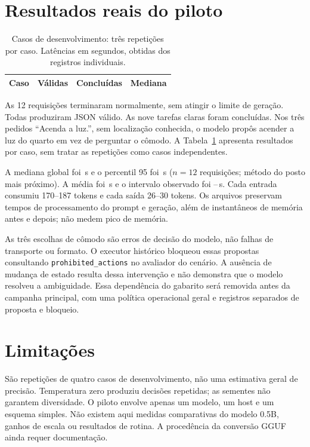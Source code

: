 \documentclass[letterpaper,conference]{IEEEtran}
\begin{document}
\section{Resultados reais do piloto}
\begin{table}[t]
\caption{Casos de desenvolvimento: três repetições por caso. Latências em segundos, obtidas dos registros individuais.}
\centering\footnotesize
\begin{tabular}{lrrr}\toprule
Caso & Válidas & Concluídas & Mediana\\\midrule

\end{tabular}
\label{tab:pilot}
\end{table}
As 12 requisições terminaram normalmente, sem atingir o limite de geração. Todas produziram JSON válido. As nove tarefas claras foram concluídas. Nos três pedidos ``Acenda a luz.'', sem localização conhecida, o modelo propôs acender a luz do quarto em vez de perguntar o cômodo. A Tabela~\ref{tab:pilot} apresenta resultados por caso, sem tratar as repetições como casos independentes.

A mediana global foi \PilotMedian\,s e o percentil 95 foi \PilotPninetyfive\,s ($n=12$ requisições; método do posto mais próximo). A média foi \PilotMean\,s e o intervalo observado foi \PilotMin--\PilotMax\,s. Cada entrada consumiu 170--187 tokens e cada saída 26--30 tokens. Os arquivos preservam tempos de processamento do prompt e geração, além de instantâneos de memória antes e depois; não medem pico de memória.

As três escolhas de cômodo são erros de decisão do modelo, não falhas de transporte ou formato. O executor histórico bloqueou essas propostas consultando \texttt{prohibited\_actions} no avaliador do cenário. A ausência de mudança de estado resulta dessa intervenção e não demonstra que o modelo resolveu a ambiguidade. Essa dependência do gabarito será removida antes da campanha principal, com uma política operacional geral e registros separados de proposta e bloqueio.
\section{Limitações}
São repetições de quatro casos de desenvolvimento, não uma estimativa geral de precisão. Temperatura zero produziu decisões repetidas; as sementes não garantem diversidade. O piloto envolve apenas um modelo, um host e um esquema simples. Não existem aqui medidas comparativas do modelo 0.5B, ganhos de escala ou resultados de rotina. A procedência da conversão GGUF ainda requer documentação.
\end{document}
